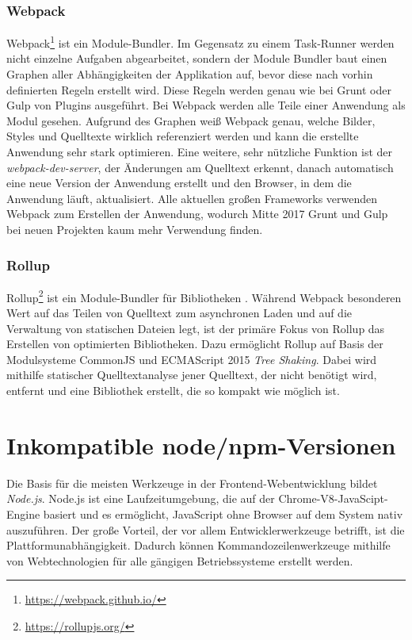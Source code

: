 \subsubsection{Webpack}
\label{sub:webpack}
Webpack\footnote{\url{https://webpack.github.io/}} ist ein Module-Bundler.
Im Gegensatz zu einem Task-Runner werden nicht einzelne Aufgaben abgearbeitet, sondern der Module Bundler baut einen Graphen aller Abhängigkeiten der Applikation auf, bevor diese nach vorhin definierten Regeln erstellt wird.
Diese Regeln werden genau wie bei Grunt oder Gulp von Plugins ausgeführt.
Bei Webpack werden alle Teile einer Anwendung als Modul gesehen.
Aufgrund des Graphen weiß Webpack genau, welche Bilder, Styles und Quelltexte wirklich referenziert werden und kann die erstellte Anwendung sehr stark optimieren.
Eine weitere, sehr nützliche Funktion ist der \emph{webpack-dev-server}, der Änderungen am Quelltext erkennt, danach automatisch eine neue Version der Anwendung erstellt und den Browser, in dem die Anwendung läuft, aktualisiert.
Alle aktuellen großen Frameworks verwenden Webpack zum Erstellen der Anwendung, wodurch Mitte 2017 Grunt und Gulp bei neuen Projekten kaum mehr Verwendung finden.

\subsubsection{Rollup}
\label{sub:rollup}
Rollup\footnote{\url{https://rollupjs.org/}} ist ein Module-Bundler für Bibliotheken \autocite{Harris.webpack-vs-rollup:online}.
Während Webpack besonderen Wert auf das Teilen von Quelltext zum asynchronen Laden und auf die Verwaltung von statischen Dateien legt, ist der primäre Fokus von Rollup das Erstellen von optimierten Bibliotheken.
Dazu ermöglicht Rollup auf Basis der Modulsysteme CommonJS und ECMAScript 2015 \emph{Tree Shaking}.
Dabei wird mithilfe statischer Quelltextanalyse jener Quelltext, der nicht benötigt wird, entfernt und eine Bibliothek erstellt, die so kompakt wie möglich ist.


\section{Inkompatible node/npm-Versionen}
Die Basis für die meisten Werkzeuge in der Frontend-Webentwicklung bildet \emph{Node.js}.
Node.js ist eine Laufzeitumgebung, die auf der Chrome-V8-JavaScipt-Engine basiert und es ermöglicht, JavaScript ohne Browser auf dem System nativ auszuführen.
Der große Vorteil, der vor allem Entwicklerwerkzeuge betrifft, ist die Plattformunabhängigkeit.
Dadurch können Kommandozeilenwerkzeuge mithilfe von Webtechnologien für alle gängigen Betriebssysteme erstellt werden.

